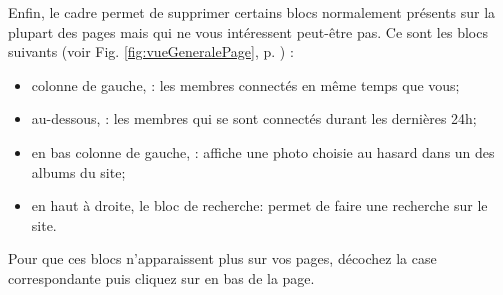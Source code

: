 \label{sec:supprimerBlocs}
Enfin, le cadre  permet de supprimer certains blocs normalement présents sur la plupart des pages mais qui ne vous intéressent peut-être pas. Ce sont les blocs suivants (voir Fig. \ref{fig:vueGeneralePage}, p. \pageref{fig:vueGeneralePage}) :
\begin{itemize}
    \item colonne de gauche, : les membres connectés en même temps que vous;
    \item au-dessous,  : les membres qui se sont connectés durant les dernières 24h;
    \item en bas colonne de gauche, : affiche une photo choisie au hasard dans un des albums du site;
    \item en haut à droite, le bloc de recherche: permet de faire une recherche sur le site.
\end{itemize}

Pour que ces blocs n’apparaissent plus sur vos pages,  décochez la case correspondante puis cliquez sur  en bas de la page.

